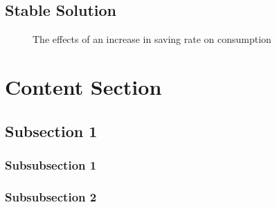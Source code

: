 \documentclass[12pt]{article} %
\begin{document}
\subsection{Stable Solution} 



\begin{figure}[H] %
	\caption{\small The effects of an increase in saving rate on consumption}
	\label{fig:speciation}
\end{figure}



\section{Content Section} %

\lipsum[5] %


\subsection{Subsection 1} %

\subsubsection{Subsubsection 1} %

\lipsum[6] %


\subsubsection{Subsubsection 2} %
\end{document}
